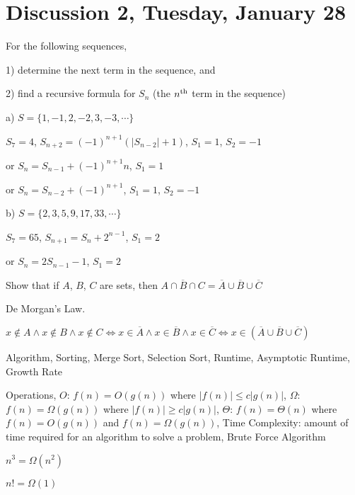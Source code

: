 \section{Discussion 2, Tuesday, January 28}

\begin{prob}

For the following sequences,

1) determine the next term in the sequence, and

2) find a recursive formula for $S_n$ (the $n^{\rm th}$ term in the sequence)

a) $S = \{1, -1, 2, -2, 3, -3, \cdots\}$

$S_7 = 4$, $S_{n + 2} = (-1)^{n + 1} (|S_{n - 2}| + 1)$, $S_1 = 1$, $S_2 = -1$

or $S_n = S_{n - 1} + (-1)^{n + 1} n$, $S_1 = 1$

or $S_n = S_{n - 2} + (-1)^{n + 1}$, $S_1 = 1$, $S_2 = -1$

b) $S = \{2, 3, 5, 9, 17, 33, \cdots\}$

$S_7 = 65$, $S_{n + 1} = S_{n} + 2^{n - 1}$, $S_1 = 2$

or $S_n = 2S_{n - 1} - 1$, $S_1 = 2$
\end{prob}

\begin{prob}
Show that if $A$, $B$, $C$ are sets, then ${\overline {A \cap B \cap C}} = {\overline A} \cup {\overline B} \cup {\overline C}$

De Morgan's Law.

$x \notin A \land x \notin B \land x \notin C \Leftrightarrow x \in \overline A \land x \in \overline B \land x \in \overline C \Leftrightarrow x \in ({\overline A} \cup {\overline B} \cup {\overline C})$

\end{prob}

Algorithm, Sorting, Merge Sort, Selection Sort, Runtime, Asymptotic Runtime, Growth Rate

Operations, $O$: $f(n) = O(g(n))$ where $|f(n)| \leq c|g(n)|$, $\Omega$: $f(n) = \Omega(g(n))$ where $|f(n)| \geq c|g(n)|$, $\Theta$: $f(n) = \Theta(n)$ where $f(n) = O(g(n))$ and $f(n) = \Omega(g(n))$, Time Complexity: amount of time required for an algorithm to solve a problem, Brute Force Algorithm

\begin{ex}
$n^3 = \Omega(n^2)$
\end{ex}

\begin{ex}
$n! = \Omega(1)$
\end{ex}

